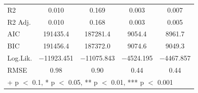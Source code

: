 \documentclass[
]{article}
\begin{document}
\begin{table}
\begin{tabular}[t]{lcccc}
R2 & \num{0.010} & \num{0.169} & \num{0.003} & \num{0.007}\\
R2 Adj. & \num{0.010} & \num{0.168} & \num{0.003} & \num{0.005}\\
AIC & \num{191435.4} & \num{187281.4} & \num{9054.4} & \num{8961.7}\\
BIC & \num{191456.4} & \num{187372.0} & \num{9074.6} & \num{9049.3}\\
Log.Lik. & \num{-11923.451} & \num{-11075.843} & \num{-4524.195} & \num{-4467.857}\\
RMSE & \num{0.98} & \num{0.90} & \num{0.44} & \num{0.44}\\
\bottomrule
\multicolumn{5}{l}{\rule{0pt}{1em}+ p $<$ 0.1, * p $<$ 0.05, ** p $<$ 0.01, *** p $<$ 0.001}\\
\end{tabular}
\end{table}
\end{document}
